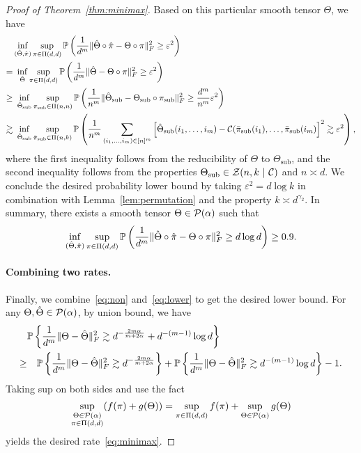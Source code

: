 \documentclass[11pt]{article}
\theoremstyle{definition}
\begin{document}
\begin{proof}[Proof of Theorem~\ref{thm:minimax}]
Based on this particular smooth tensor $\Theta$, we have
\begin{align}\label{eq:lower}
&\inf_{(\hat \Theta,\hat \pi)}\sup_{\pi\in \Pi(d,d)}\mathbb{P}\left({1\over d^m}\FnormSize{}{\hat \Theta\circ \hat \pi-\Theta\circ \pi}^2\geq \varepsilon^2\right)\notag \\
=&\ \inf_{\hat \Theta}\sup_{\pi\in \Pi(d,d)}\mathbb{P}\left({1\over d^m}\FnormSize{}{\hat \Theta-\Theta\circ \pi}^2\geq \varepsilon^2\right)\notag \\
\geq & \ \inf_{\hat  \Theta_{\text{sub}}}\sup_{\pi_{\text{sub}}\in\Pi(n,n)}\mathbb{P}\left({1\over n^m}\FnormSize{}{\hat \Theta_\text{sub}-\Theta_{\text{sub}}\circ \pi_{\text{sub}}}^2\geq {d^m\over n^m} \varepsilon^2\right)\notag \\
\gtrsim & \ \inf_{\hat  \Theta_{\text{sub}}}\sup_{\bar \pi_{\text{sub}}\in\Pi(n,k)}\mathbb{P}\left({1\over n^m}\sum_{(i_1,\ldots,i_m)\in[n]^m}\left[\hat \Theta_\text{sub}(i_1,\ldots,i_m)-\tC(\bar \pi_{\text{sub}}(i_1),\ldots,\bar \pi_{\text{sub}}(i_m)\right]^2\gtrsim \varepsilon^2\right),
\end{align}
where the first inequality follows from the reducibility of $\Theta$ to $\Theta_{\text{sub}}$, and the second inequality follows from the properties $\Theta_{\text{sub}}\in \mathcal{Z}(n,k\ |\ \mathcal{C})$ and $n\asymp d$. 
We conclude the desired probability lower bound by taking $\varepsilon^2={d\log k }$ in combination with Lemma~\ref{lem:permutation} and the property $k\asymp d^{\gamma_2}$. In summary, there exists a smooth tensor $\Theta\in\mathcal{P}(\alpha)$ such that
\[
\inf_{(\hat \Theta,\hat \pi)}\sup_{\pi\in \Pi(d,d)}\mathbb{P}\left({1\over d^m}\lVert\hat \Theta\circ \hat \pi-\Theta\circ \pi\rVert_F^2\geq d\log d\right) \geq 0.9.
\]


\paragraph{Combining two rates.} Finally, we combine~\eqref{eq:non} and~\eqref{eq:lower} to get the desired lower bound. For any $\Theta, \hat \Theta \in \mathcal{P}(\alpha)$, by union bound, we have
\begin{align}
&\mathbb{P}\left\{ {1\over d^m}\lVert\Theta-\hat \Theta\rVert_F^2\gtrsim d^{-{2m\alpha\over m+2\alpha}}+d^{-(m-1)}\log d\right\}\\
\geq &\quad \mathbb{P}\left\{ {1\over d^m}\lVert\Theta-\hat \Theta\rVert_F^2\gtrsim d^{-{2m\alpha\over m+2\alpha}}\right\} +\mathbb{P}\left\{ {1\over d^m}\lVert\Theta-\hat \Theta\rVert_F^2\gtrsim d^{-(m-1)}\log d\right\}-1.
\end{align}
Taking sup on both sides and use the fact 
\[
\sup_{\substack{\Theta\in \mathcal{P}(\alpha)\\\pi\in \Pi(d,d)}}(f(\pi)+g(\Theta))=\sup_{\pi\in \Pi(d,d)}f(\pi)+\sup_{\Theta\in \mathcal{P}(\alpha)}g(\Theta)
\]
yields the desired rate~\eqref{eq:minimax}. 
\end{proof}
\end{document}
